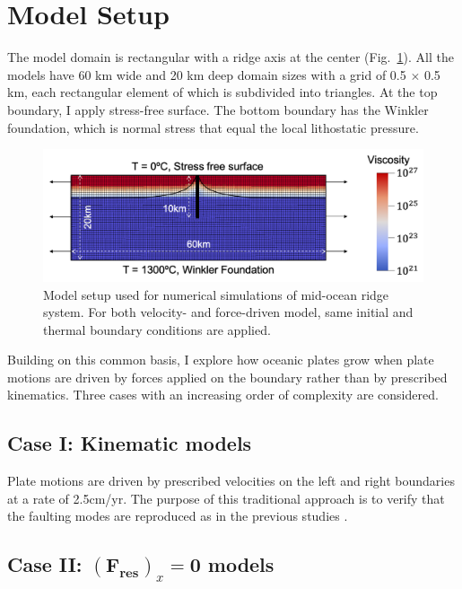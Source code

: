 \documentclass[letterpaper,12pt,notitle]{memphisthesis}                     %
\begin{document}
\section{Model Setup}
The model domain is rectangular with a ridge axis at the center  (Fig.~\ref{fig:modelsetup}). All the models have 60 km wide and 20 km deep domain sizes with a grid of 0.5 $\times$ 0.5 km, each rectangular element of which is subdivided into triangles. At the top boundary, I apply stress-free surface.
The bottom boundary has the Winkler foundation, which is normal stress that equal the local lithostatic pressure.
%
\begin{figure}[!htb]
	\centering
	\includegraphics[width=0.8\linewidth,trim=8 8 8 8,clip]{./figs/modelsetup.png}
	\caption{Model setup used for numerical simulations of mid-ocean ridge system. For both velocity- and force-driven model, same initial and thermal boundary conditions are applied.}
	\label{fig:modelsetup}
\end{figure}
%

Building on this common basis, I explore how oceanic plates grow when plate motions are driven by forces applied on the boundary rather than by prescribed kinematics. Three cases with an increasing order of complexity are considered.

\subsection{Case I: Kinematic models}

Plate motions are driven by prescribed velocities on the left and right boundaries at a rate of 2.5cm/yr. The purpose of this traditional approach is to verify that the faulting modes are reproduced as in the previous studies \citep{Buck2005,Tucholke2008}.

\subsection{Case II: $(\boldsymbol{F_{res}})_x \mathbf{=0}$ models}
\end{document}
